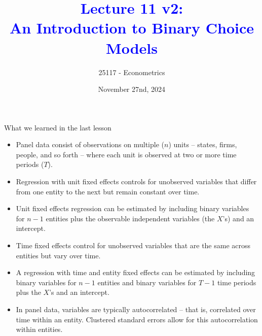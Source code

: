 \documentclass[notes,10pt, aspectratio=169]{beamer}
\title[]{\textcolor{blue}{Lecture 11 v2:\\An Introduction to Binary Choice Models}}
\author{25117 - Econometrics}
\institute[shortinst]{Universitat Pompeu Fabra}
\date{November 27nd, 2024}
\begin{document}
\begin{frame}[plain]
\maketitle
\end{frame}



\begin{frame}{What we learned in the last lesson}
\begin{itemize}
\item Panel data consist of observations on multiple ($n$) units -- states, firms, people, and so forth -- where each unit is observed at two or more time periods ($T$).
\item Regression with unit fixed effects controls for unobserved variables that differ from one entity to the next but remain constant over time.
\item Unit fixed effects regression can be estimated by including binary variables for $n - 1$ entities plus the observable independent variables (the $X$’s) and an intercept.
\item Time fixed effects control for unobserved variables that are the same across entities but vary over time.
\item A regression with time and entity fixed effects can be estimated by including binary variables for $n - 1$ entities and binary variables for $T - 1$ time periods plus the $X$’s and an intercept.
\item In panel data, variables are typically autocorrelated -- that is, correlated over time within an entity. Clustered standard errors allow for this autocorrelation within entities.
\end{itemize}
\end{frame}
\end{document}
